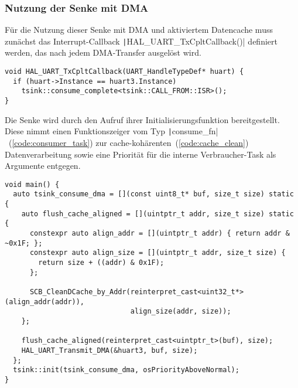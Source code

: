 \subsubsection{Nutzung der Senke mit DMA}

Für die Nutzung dieser Senke mit DMA und aktiviertem Datencache muss zunächst
das Interrupt-Callback \texttt|HAL_UART_TxCpltCallback()| definiert
werden, das nach jedem DMA-Transfer ausgelöst wird.

\begin{code}
\begin{verbatim}
void HAL_UART_TxCpltCallback(UART_HandleTypeDef* huart) {
  if (huart->Instance == huart3.Instance)
    tsink::consume_complete<tsink::CALL_FROM::ISR>();
}
\end{verbatim}
\end{code}

Die Senke wird durch den Aufruf ihrer Initialisierungsfunktion bereitgestellt.
Diese nimmt einen Funktionszeiger vom Typ
\texttt|consume_fn|~(\ref{code:consumer_task}) zur
cache-kohärenten~(\ref{code:cache_clean}) Datenverarbeitung sowie eine Priorität
für die interne Verbraucher-Task als Argumente entgegen.

\begin{code}
\begin{verbatim}
void main() {
  auto tsink_consume_dma = [](const uint8_t* buf, size_t size) static {
    auto flush_cache_aligned = [](uintptr_t addr, size_t size) static {
      constexpr auto align_addr = [](uintptr_t addr) { return addr & ~0x1F; };
      constexpr auto align_size = [](uintptr_t addr, size_t size) {
        return size + ((addr) & 0x1F);
      };

      SCB_CleanDCache_by_Addr(reinterpret_cast<uint32_t*>(align_addr(addr)),
                              align_size(addr, size));
    };

    flush_cache_aligned(reinterpret_cast<uintptr_t>(buf), size);
    HAL_UART_Transmit_DMA(&huart3, buf, size);
  };
  tsink::init(tsink_consume_dma, osPriorityAboveNormal);
}
\end{verbatim}
\end{code}

